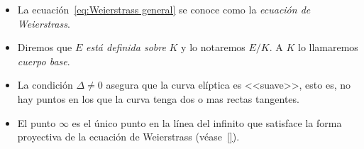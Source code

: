 \begin{nota}\leavevmode
	\begin{itemize}
		\item La ecuación~\eqref{eq:Weierstrass general} se conoce como la \emph{ecuación de Weierstrass}.
		\item Diremos que $E$ \emph{está definida sobre} $K$ y lo notaremos $E/K$. A $K$ lo llamaremos \emph{cuerpo base}.
		\item La condición $\Delta \neq 0$ asegura que la curva elíptica es <<suave>>, esto es, no hay puntos en los que la curva tenga dos o mas rectas tangentes.
		\item El punto $\infty$ es el único punto en la línea del infinito que satisface la forma proyectiva de la ecuación de Weierstrass (véase~\ref{}).
	\end{itemize}
\end{nota}

